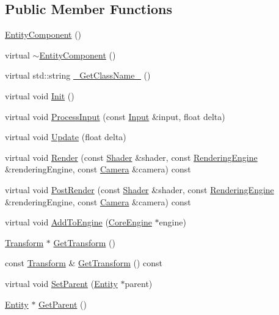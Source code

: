 \subsection*{Public Member Functions}
\begin{DoxyCompactItemize}
\item 
\hyperlink{class_entity_component_a5b45c598f39fcc9237d1ab02dde89cd7}{Entity\+Component} ()
\item 
virtual \hyperlink{class_entity_component_a242864ddd9852130396e445386ae123f}{$\sim$\+Entity\+Component} ()
\item 
virtual std\+::string \hyperlink{class_entity_component_a145c9da56a1ed62e159514e14e4d8e16}{\+\_\+\+Get\+Class\+Name\+\_\+} ()
\item 
virtual void \hyperlink{class_entity_component_ae8878fb678135211d30c6ef23d8447e7}{Init} ()
\item 
virtual void \hyperlink{class_entity_component_a2145c244df8f84a1291e58bf1482a940}{Process\+Input} (const \hyperlink{class_input}{Input} \&input, float delta)
\item 
virtual void \hyperlink{class_entity_component_aa73f3be22173ada22f997825f29aa918}{Update} (float delta)
\item 
virtual void \hyperlink{class_entity_component_abb4682ad76a14bd2d3a7048eb82f3cda}{Render} (const \hyperlink{class_shader}{Shader} \&shader, const \hyperlink{class_rendering_engine}{Rendering\+Engine} \&rendering\+Engine, const \hyperlink{class_camera}{Camera} \&camera) const 
\item 
virtual void \hyperlink{class_entity_component_a43c059d7bf5a5bc1ef90c042c1bf7866}{Post\+Render} (const \hyperlink{class_shader}{Shader} \&shader, const \hyperlink{class_rendering_engine}{Rendering\+Engine} \&rendering\+Engine, const \hyperlink{class_camera}{Camera} \&camera) const 
\item 
virtual void \hyperlink{class_entity_component_a70083a6d43cc3330ee2914b446db1cf6}{Add\+To\+Engine} (\hyperlink{class_core_engine}{Core\+Engine} $\ast$engine)
\item 
\hyperlink{class_transform}{Transform} $\ast$ \hyperlink{class_entity_component_a59e8c59a5f0eda12e4702d8767757566}{Get\+Transform} ()
\item 
const \hyperlink{class_transform}{Transform} \& \hyperlink{class_entity_component_a53dffd62a15933b387a919fe4d56c9bc}{Get\+Transform} () const 
\item 
virtual void \hyperlink{class_entity_component_a99e0aca0d54b535a83f27b9a80845458}{Set\+Parent} (\hyperlink{class_entity}{Entity} $\ast$parent)
\item 
\hyperlink{class_entity}{Entity} $\ast$ \hyperlink{class_entity_component_a1f7f2527931a1ee880178e1587e997b5}{Get\+Parent} ()
\end{DoxyCompactItemize}


